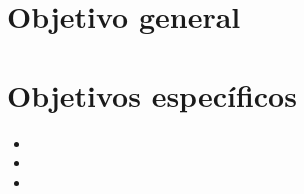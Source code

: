 
\section{Objetivo general}

\section{Objetivos específicos}
\begin{itemize}
    \item 
    \item 
    \item 
\end{itemize}
